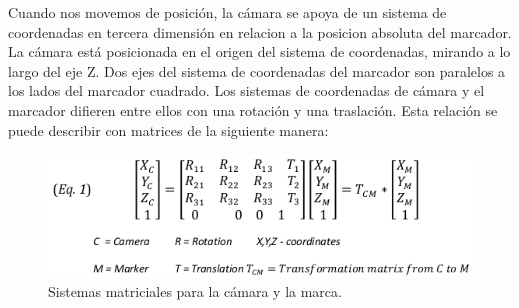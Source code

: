 Cuando nos movemos de posición, la cámara se apoya de un sistema de coordenadas  en tercera dimensión en relacion a la posicion absoluta del marcador. La cámara está posicionada en el origen del sistema de coordenadas, mirando a lo largo del eje Z. Dos ejes del sistema de coordenadas del marcador son paralelos a los lados del marcador cuadrado. Los sistemas de coordenadas de cámara y el marcador difieren entre ellos con una rotación y una traslación. Esta relación se puede describir con matrices de la siguiente manera:
\begin{figure}[h!]
	\centering
	\includegraphics[width=12cm]{imagenes/marcoteorico/plataformas/eq01ArToolKit.png}
	\caption{Sistemas matriciales para la cámara y la marca.\cite{B13}}
	\label{fig:analogo}
\end{figure}
\newpage

